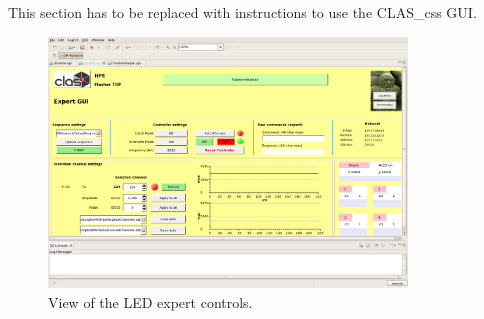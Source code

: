 \documentclass[12pt]{article}
\begin{document}
This section has to be replaced with instructions to use the CLAS\_css GUI.

\begin{figure}[htbp]
\center
\includegraphics[width=0.85\textwidth]{pics/LEDExpert_2014_12_20.png}
\caption{\small \label{LEDexpert} View of the LED expert controls.}
\end{figure}
\end{document}
